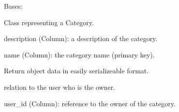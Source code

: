 \documentclass[letterpaper,10pt,english]{sphinxmanual}
\begin{document}
\begin{fulllineitems}
\label{database_setup:database_setup.Category}
Bases: 

Class representing a Category.

\begin{fulllineitems}
\label{database_setup:database_setup.Category.description}
description (Column): a description of the category.

\end{fulllineitems}


\begin{fulllineitems}
\label{database_setup:database_setup.Category.name}
name (Column): the category name (primary key).

\end{fulllineitems}


\begin{fulllineitems}
\label{database_setup:database_setup.Category.serialize}
Return object data in easily serializeable format.

\end{fulllineitems}


\begin{fulllineitems}
\label{database_setup:database_setup.Category.user}
relation to the user who is the owner.

\end{fulllineitems}


\begin{fulllineitems}
\label{database_setup:database_setup.Category.user_id}
user\_id (Column): reference to the owner of the category.

\end{fulllineitems}


\end{fulllineitems}
\end{document}
